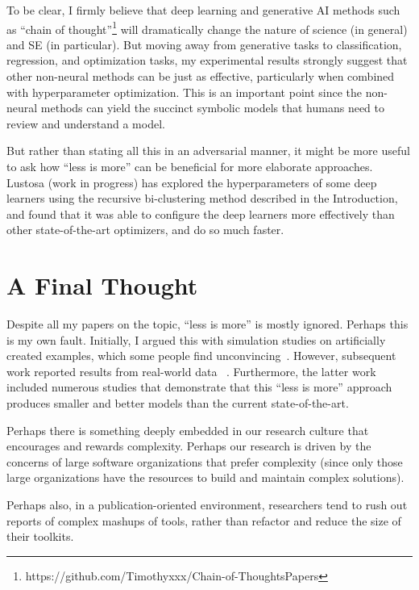 \documentclass[sigconf,screen]{acmart}
\begin{document}
To be clear, I firmly believe that deep learning and generative AI methods
such as ``chain of thought''\footnote{https://github.com/Timothyxxx/Chain-of-ThoughtsPapers} will dramatically change the nature of science (in general) and SE (in particular).  But moving
away from generative tasks to classification, regression, and optimization tasks, my
experimental results strongly suggest that   other non-neural  methods can be just as effective, particularly when combined with hyperparameter optimization. This is an important point since the non-neural methods can yield the succinct symbolic models that humans need to review and understand a model.

But rather than stating all this in an adversarial manner, it might be more useful to ask how ``less is more'' can be beneficial for more
elaborate approaches. Lustosa (work in progress) has explored the hyperparameters of some deep learners using the recursive bi-clustering method described in the Introduction, and found that it was able to configure the deep learners more effectively than other state-of-the-art optimizers, and do so much faster.


 

\section{A Final Thought}
 
Despite all my   papers on the topic, ``less is more'' is mostly ignored.  Perhaps this is my own fault.
 Initially, I  argued this with simulation studies on artificially created examples, which some people find unconvincing~\cite{menzies2000testing,menzies2004many}. However,   subsequent work reported results from real-world data ~\cite{menziees07strange,menzies2008implications,chen2005finding,menzies2006data,partington2015reduced,jalali2008optimizing,Chen19,lustosa2023optimizing,agrawal2020better,ling2023benefits,yu2019improving,10.1145/3583565}. Furthermore, the latter work included numerous studies that demonstrate that this ``less is more'' approach produces smaller and better models than the current state-of-the-art.

Perhaps there is something deeply embedded in our research culture that encourages and rewards complexity.
Perhaps our
research is driven by the concerns of large software organizations that
prefer complexity (since only those large organizations have the resources to build and maintain complex solutions).

Perhaps also,  in a publication-oriented environment, researchers tend to rush out reports of complex mashups of tools,
rather than refactor and reduce the size of their toolkits. 
\end{document}
